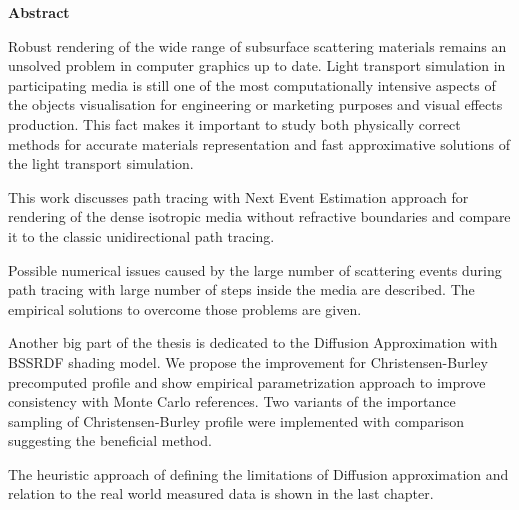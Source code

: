 
\clearemptydoublepage
{}
{}

\vspace*{2cm}
\begin{center}
{\Large \textbf{Abstract}}
\end{center}
\vspace{1cm}

Robust rendering of the wide range of subsurface scattering materials remains an unsolved problem in
computer graphics up to date. Light transport simulation in participating media is still one of the
most computationally intensive aspects of the objects visualisation for engineering or marketing
purposes and visual effects production. This fact makes it important to study both physically
correct methods for accurate materials representation and fast approximative solutions of the light
transport simulation.

This work discusses path tracing with Next Event Estimation approach for rendering of the dense
isotropic media without refractive boundaries and compare it to the classic unidirectional path
tracing.

Possible numerical issues caused by the large number of scattering events during path tracing with
large number of steps inside the media are described. The empirical solutions to overcome those
problems are given.

Another big part of the thesis is dedicated to the Diffusion Approximation with BSSRDF shading
model. We propose the improvement for Christensen-Burley precomputed profile and show empirical
parametrization approach to improve consistency with Monte Carlo references. Two variants of the
importance sampling of Christensen-Burley profile were implemented with comparison suggesting the
beneficial method.

The heuristic approach of defining the limitations of Diffusion approximation and relation to the
real world measured data is shown in the last chapter.
